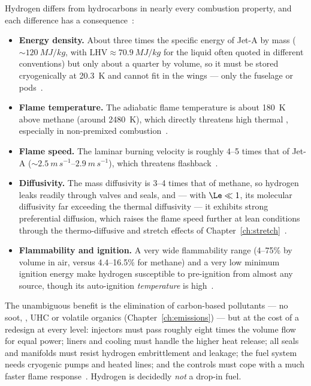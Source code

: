 Hydrogen differs from hydrocarbons in nearly every combustion property, and each difference has a consequence~\cite{lecture14part1}:
\begin{itemize}[leftmargin=1.5em,itemsep=2pt]
\item \textbf{Energy density.} About three times the specific energy of Jet-A by mass ($\sim\SI{120}{MJ/kg}$, with $\mathrm{LHV}\approx\SI{70.9}{MJ/kg}$ for the liquid often quoted in different conventions) but only about a quarter by volume, so it must be stored cryogenically at \SI{20.3}{K} and cannot fit in the wings --- only the fuselage or pods~\cite{lecture14part1}.
\item \textbf{Flame temperature.} The adiabatic flame temperature is about \SI{180}{K} above methane (around \SI{2480}{K}), which directly threatens high thermal , especially in non-premixed combustion~\cite{lecture14part1}.
\item \textbf{Flame speed.} The laminar burning velocity is roughly 4--5 times that of Jet-A ($\sim\SIrange{2.5}{2.9}{m\,s^{-1}}$), which threatens flashback~\cite{lecture14part1}.
\item \textbf{Diffusivity.} The mass diffusivity is 3--4 times that of methane, so hydrogen leaks readily through valves and seals, and --- with $\Le\ll1$, its molecular diffusivity far exceeding the thermal diffusivity --- it exhibits strong preferential diffusion, which raises the flame speed further at lean conditions through the thermo-diffusive and stretch effects of Chapter~\ref{ch:stretch}~\cite{lecture14part1}.
\item \textbf{Flammability and ignition.} A very wide flammability range (4--75\% by volume in air, versus 4.4--16.5\% for methane) and a very low minimum ignition energy make hydrogen susceptible to pre-ignition from almost any source, though its auto-ignition \emph{temperature} is high~\cite{lecture14part1}.
\end{itemize}
The unambiguous benefit is the elimination of carbon-based pollutants --- no soot, , UHC or volatile organics (Chapter~\ref{ch:emissions}) --- but at the cost of a redesign at every level: injectors must pass roughly eight times the volume flow for equal power; liners and cooling must handle the higher heat release; all seals and manifolds must resist hydrogen embrittlement and leakage; the fuel system needs cryogenic pumps and heated lines; and the controls must cope with a much faster flame response~\cite{lecture14part1}. Hydrogen is decidedly \emph{not} a drop-in fuel.

